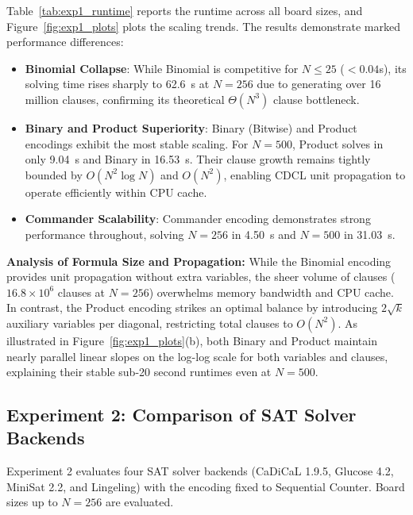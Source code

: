 \documentclass[a4paper,fleqn]{cas-sc}
\begin{document}
Table~\ref{tab:exp1_runtime} reports the runtime across all board sizes, and Figure~\ref{fig:exp1_plots} plots the scaling trends. The results demonstrate marked performance differences:
\begin{itemize}[noitemsep]
    \item \textbf{Binomial Collapse}: While Binomial is competitive for $N \le 25$ ($<0.04$s), its solving time rises sharply to 62.6~s at $N = 256$ due to generating over 16 million clauses, confirming its theoretical $\Theta(N^3)$ clause bottleneck.
    \item \textbf{Binary and Product Superiority}: Binary (Bitwise) and Product encodings exhibit the most stable scaling. For $N = 500$, Product solves in only 9.04~s and Binary in 16.53~s. Their clause growth remains tightly bounded by $O(N^2 \log N)$ and $O(N^2)$, enabling CDCL unit propagation to operate efficiently within CPU cache.
    \item \textbf{Commander Scalability}: Commander encoding demonstrates strong performance throughout, solving $N = 256$ in 4.50~s and $N = 500$ in 31.03~s.
\end{itemize}

\noindent\textbf{Analysis of Formula Size and Propagation:} While the Binomial encoding provides unit propagation without extra variables, the sheer volume of clauses ($16.8 \times 10^6$ clauses at $N=256$) overwhelms memory bandwidth and CPU cache. In contrast, the Product encoding strikes an optimal balance by introducing $2\sqrt{k}$ auxiliary variables per diagonal, restricting total clauses to $O(N^2)$. As illustrated in Figure~\ref{fig:exp1_plots}(b), both Binary and Product maintain nearly parallel linear slopes on the log-log scale for both variables and clauses, explaining their stable sub-20 second runtimes even at $N=500$.

\subsection{Experiment 2: Comparison of SAT Solver Backends}
\label{sec:exp2_results}

Experiment 2 evaluates four SAT solver backends (CaDiCaL 1.9.5, Glucose 4.2, MiniSat 2.2, and Lingeling) with the encoding fixed to Sequential Counter. Board sizes up to $N = 256$ are evaluated.
\end{document}
